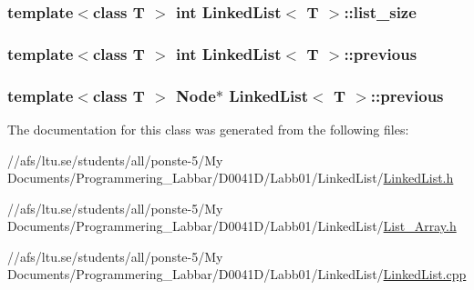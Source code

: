 \hypertarget{class_linked_list_affff5ce490bbe41e4d1bcb21b846891c}{
\subsubsection[{list\-\_\-size}]{\setlength{\rightskip}{0pt plus 5cm}template$<$class T $>$ int {\bf Linked\-List}$<$ T $>$\-::list\-\_\-size\hspace{0.3cm}{\ttfamily [protected]}}}\label{class_linked_list_affff5ce490bbe41e4d1bcb21b846891c}
\hypertarget{class_linked_list_ad8fb5d6184b9d23087bd4916722ee3ae}{
\subsubsection[{previous}]{\setlength{\rightskip}{0pt plus 5cm}template$<$class T $>$ int {\bf Linked\-List}$<$ T $>$\-::previous\hspace{0.3cm}{\ttfamily [protected]}}}\label{class_linked_list_ad8fb5d6184b9d23087bd4916722ee3ae}
\hypertarget{class_linked_list_a3489a27822d31002e3ffeea44b402296}{
\subsubsection[{previous}]{\setlength{\rightskip}{0pt plus 5cm}template$<$class T $>$ {\bf Node}$\ast$ {\bf Linked\-List}$<$ T $>$\-::previous\hspace{0.3cm}{\ttfamily [protected]}}}\label{class_linked_list_a3489a27822d31002e3ffeea44b402296}


The documentation for this class was generated from the following files\-:\begin{DoxyCompactItemize}
\item 
//afs/ltu.\-se/students/all/ponste-\/5/\-My Documents/\-Programmering\-\_\-\-Labbar/\-D0041\-D/\-Labb01/\-Linked\-List/\hyperlink{_linked_list_8h}{Linked\-List.\-h}\item 
//afs/ltu.\-se/students/all/ponste-\/5/\-My Documents/\-Programmering\-\_\-\-Labbar/\-D0041\-D/\-Labb01/\-Linked\-List/\hyperlink{_list___array_8h}{List\-\_\-\-Array.\-h}\item 
//afs/ltu.\-se/students/all/ponste-\/5/\-My Documents/\-Programmering\-\_\-\-Labbar/\-D0041\-D/\-Labb01/\-Linked\-List/\hyperlink{_linked_list_8cpp}{Linked\-List.\-cpp}\end{DoxyCompactItemize}
